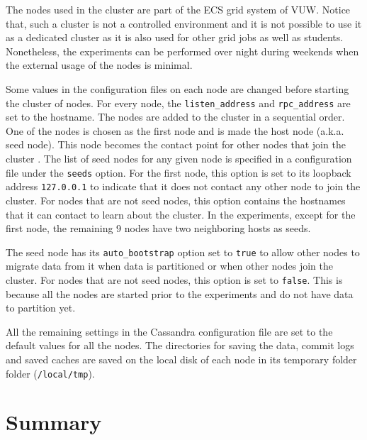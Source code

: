  


The nodes used in the cluster are part of the \ac{ECS} grid system of
\ac{VUW}. Notice that, such a cluster is not a controlled environment and it is
not possible to use it as  a dedicated cluster as it is also used for other grid
jobs as well as students. Nonetheless, the experiments can be performed over
night during weekends when the external usage of the nodes is minimal.

Some values in the configuration files on each node are changed before starting
the cluster of nodes.  For every node,  the \texttt{listen\_address} and
\texttt{rpc\_address} are set to the hostname.  The nodes are added to the
cluster in a sequential order.  One of the nodes is chosen as the first node and
is made the host node (a.k.a. seed node).  
This node becomes the contact point
for other nodes that join the cluster .
The list of seed nodes for any given node is specified in a configuration file under the \texttt{seeds} option.  For the
 first node,  this option is set to its loopback address \texttt{127.0.0.1}
 to indicate that it does not contact any other node to join the cluster.  For
 nodes that are not seed nodes, this option contains the hostnames that it can
contact to learn about the cluster.  In the experiments,  except for the first
node, the remaining 9 nodes have two neighboring hosts  as seeds. 

The seed node has its \texttt{auto\_bootstrap} option set to \texttt{true} to
allow other nodes to migrate data from it when data is partitioned or when other
nodes join the cluster.  For nodes that are not seed nodes,  this option is set
to \texttt{false}.  This is because all the nodes are started prior to the 
experiments and do not have data to partition yet. 
 

All the remaining
settings in the Cassandra configuration file are set to the  default values
for all the nodes.  The directories for saving the data,  commit logs and saved
caches are saved on the local disk of each node in its temporary
folder folder (\texttt{/local/tmp}).









\section{Summary} \label{sexp:Summary} 

